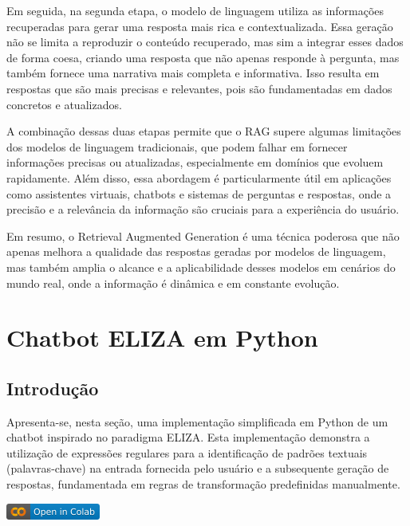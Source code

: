 \documentclass[14pt,a4paper,oneside]{book}
\begin{document}
Em seguida, na segunda etapa, o modelo de linguagem utiliza as informações recuperadas para gerar uma resposta mais rica e contextualizada. Essa geração não se limita a reproduzir o conteúdo recuperado, mas sim a integrar esses dados de forma coesa, criando uma resposta que não apenas responde à pergunta, mas também fornece uma narrativa mais completa e informativa. Isso resulta em respostas que são mais precisas e relevantes, pois são fundamentadas em dados concretos e atualizados.

A combinação dessas duas etapas permite que o RAG supere algumas limitações dos modelos de linguagem tradicionais, que podem falhar em fornecer informações precisas ou atualizadas, especialmente em domínios que evoluem rapidamente. Além disso, essa abordagem é particularmente útil em aplicações como assistentes virtuais, chatbots e sistemas de perguntas e respostas, onde a precisão e a relevância da informação são cruciais para a experiência do usuário.

Em resumo, o Retrieval Augmented Generation é uma técnica poderosa que não apenas melhora a qualidade das respostas geradas por modelos de linguagem, mas também amplia o alcance e a aplicabilidade desses modelos em cenários do mundo real, onde a informação é dinâmica e em constante evolução.

\chapter{Chatbot ELIZA em Python}

\section{Introdução}

Apresenta-se, nesta seção, uma implementação simplificada em Python de um chatbot inspirado no paradigma ELIZA. Esta implementação demonstra a utilização de expressões regulares para a identificação de padrões textuais (palavras-chave) na entrada fornecida pelo usuário e a subsequente geração de respostas, fundamentada em regras de transformação predefinidas manualmente.

\vspace{\baselineskip}
\href{https://colab.research.google.com/github/giseldo/chatbotbook/blob/main/notebook/eliza.ipynb}{
  \includegraphics{fig/colab-badge.png}
}
\end{document}
